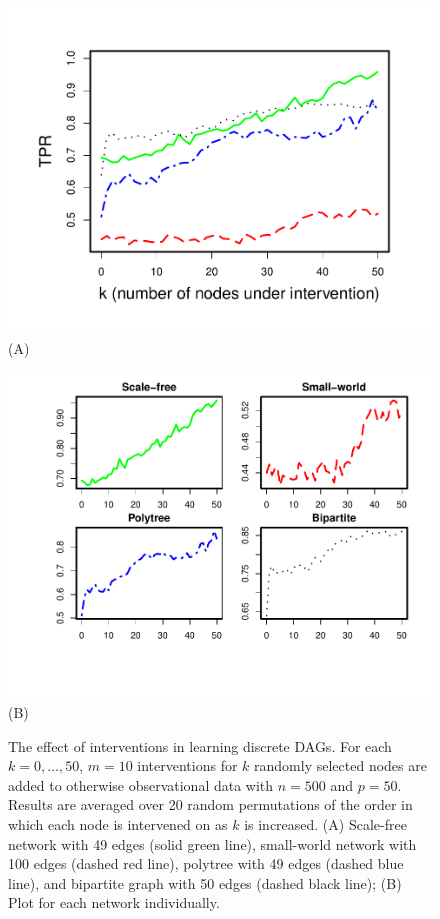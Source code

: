 \documentclass[article]{jss}
\renewcommand{\|}{\,|\,}
\begin{document}
\begin{figure}[t!]
\centering
\begin{minipage}[b]{0.45\linewidth} 
\centering
\includegraphics[width=1\linewidth]{4_A_discrete.pdf} \\
(A)
\end{minipage}
\begin{minipage}[b]{0.45\linewidth}
\centering
\includegraphics[width=1.1\linewidth]{4_B_discrete.pdf} \\
(B)
\end{minipage}
\caption{The effect of interventions in learning discrete DAGs. For each $k=0,\ldots,50$, $m=10$ interventions for $k$ randomly selected nodes are added to otherwise observational data with $n = 500$ and $p = 50$. Results are averaged over 20 random permutations of the order in which each node is intervened on as $k$ is increased. (A) Scale-free network with 49 edges (solid green line), small-world network with 100 edges (dashed red line), polytree with 49 edges (dashed blue line), and bipartite graph with 50 edges (dashed black line); (B) Plot for each network individually.}
\label{fig:intervene-sub}
\end{figure}
\end{document}
